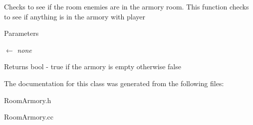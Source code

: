 Checks to see if the room enemies are in the armory room. This function checks to see if anything is in the armory with player 
\begin{DoxyParams}{Parameters}
\item[\mbox{$\leftarrow$} {\em none}]\end{DoxyParams}
\begin{DoxyReturn}{Returns}
bool -\/ true if the armory is empty otherwise false 
\end{DoxyReturn}


The documentation for this class was generated from the following files:\begin{DoxyCompactItemize}
\item 
RoomArmory.h\item 
RoomArmory.cc\end{DoxyCompactItemize}
